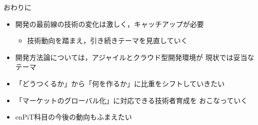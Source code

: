 \documentclass[t]{beamer}
\begin{document}
\begin{frame}[label=sec-11]{おわりに}
\begin{itemize}
\item 開発の最前線の技術の変化は激しく，キャッチアップが必要
\begin{itemize}
\item 技術動向を踏まえ，引き続きテーマを見直していく
\end{itemize}
\item 開発方法論については，アジャイルとクラウド型開発環境が
現状では妥当なテーマ
\item 「どうつくるか」から「何を作るか」に比重をシフトしていきたい
\item 「マーケットのグローバル化」に対応できる技術者育成を
おこなっていく
\item enPiT科目の今後の動向もふまえたい
\end{itemize}
\end{frame}
\end{document}
